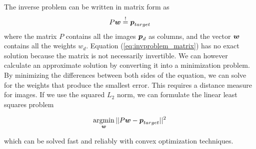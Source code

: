   The inverse problem can be written in matrix form as 
 \begin{equation}
  \label{eq:invproblem_matrix}
    P\boldsymbol{w}  \stackrel{!}{=} \boldsymbol{p}_{target}
  \end{equation}
   where the matrix $P$ contains all the images $\boldsymbol{p}_d$ as columns, and the vector $\boldsymbol{w}$ contains all the weights $w_d$.
   Equation (\ref{eq:invproblem_matrix}) has no exact solution because the matrix is not necessarily invertible.
   We can however calculate an approximate solution by converting it into a minimization problem.
   By minimizing the differences between both sides of the equation, we can solve for the weights that produce the smallest error.
   This requires a distance measure for images. If we use the squared $L_2$ norm, we can formulate the linear least squares problem
 
 \begin{equation}
   \label{eq:minproblem}
   \operatorname*{argmin}_{\boldsymbol{w}} ||P\boldsymbol{w} - \boldsymbol{p}_{target}||^2
  \end{equation}
   
   which can be solved fast and reliably with convex optimization techniques.  
   
   
